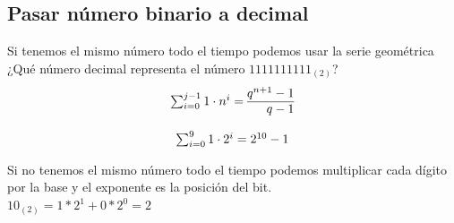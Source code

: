 \documentclass[10pt,a4paper]{article}
\begin{document}
\subsection*{Pasar número binario a decimal}
Si tenemos el mismo número todo el tiempo podemos usar la serie geométrica \\

¿Qué número decimal representa el número \(1111111111_{(2)}\)?
\[
\begin{array}{l}
\sum_{i=0}^{j-1} 1 \cdot n^i = \begin{array}{@{} r @{}}
    q^{n+1} - 1 \\
    \hline
    q-1
 \end{array}
\end{array}
\]

\[
\begin{array}{l}
\sum_{i=0}^{9} 1 \cdot 2^i = \begin{array}{@{} r @{}}
    2^{10} - 1 \\
 \end{array}
\end{array}
\]

Si no tenemos el mismo número todo el tiempo podemos multiplicar cada dígito por la base y el exponente es la posición del bit. \\

\(10_{(2)} = 1 \ast 2^{1} + 0 \ast 2^{0} = 2 \)
\end{document}
